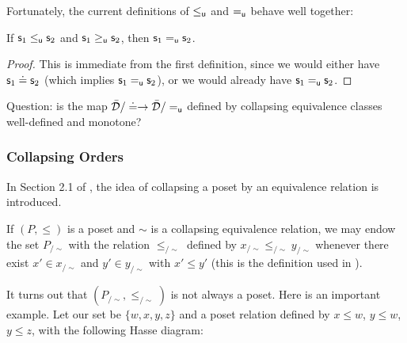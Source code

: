 \documentclass[10pt, onecolumn, longbibliography, nofootinbib]{revtex4-2}
\begin{document}
Fortunately, the current definitions of $\leq_{\mathsf{u}}$ and $=_{\mathsf{u}}$ behave well together:

\begin{prop}
	If $\mathsf{s}_1\leq_{\mathsf{u}}\mathsf{s}_2$ and $\mathsf{s}_1\geq_{\mathsf{u}} \mathsf{s}_2$, then $\mathsf{s}_1=_{\mathsf{u}}\mathsf{s}_2$.
\end{prop}
\begin{proof}
	This is immediate from the first definition, since we would either have $\mathsf{s}_1\doteq\mathsf{s}_2$ (which implies $\mathsf{s}_1=_{\mathsf{u}}\mathsf{s}_2$), or we would already have $\mathsf{s}_1=_{\mathsf{u}}\mathsf{s}_2$.
\end{proof}



Question: is the map $\bar{\mathcal{D}} / \doteq \to \bar{\mathcal{D}} / =_{\mathsf{u}}$ defined by collapsing equivalence classes well-defined and monotone? 


\subsubsection{Collapsing Orders}
In Section 2.1 of \cite{quotientposets}, the idea of collapsing a poset by an equivalence relation is introduced. 

If $(P,\leq)$ is a poset and $\sim$ is a collapsing equivalence relation, we may endow the set $P_{/\sim}$ with the relation $\leq_{/\sim}$ defined by $x_{/\sim} \leq_{/\sim} y_{/\sim}$ whenever there exist $x'\in x_{/\sim}$ and $y'\in y_{/\sim}$ with $x'\leq y'$ (this is the definition used in \cite{quotientposets}). 

It turns out that $(P_{/\sim},\leq_{/\sim})$ is not always a poset. Here is an important example. Let our set be $\{w,x,y,z\}$ and a poset relation defined by $x\leq w$, $y\leq w$, $y\leq z$, with the following Hasse diagram:

\end{document}
